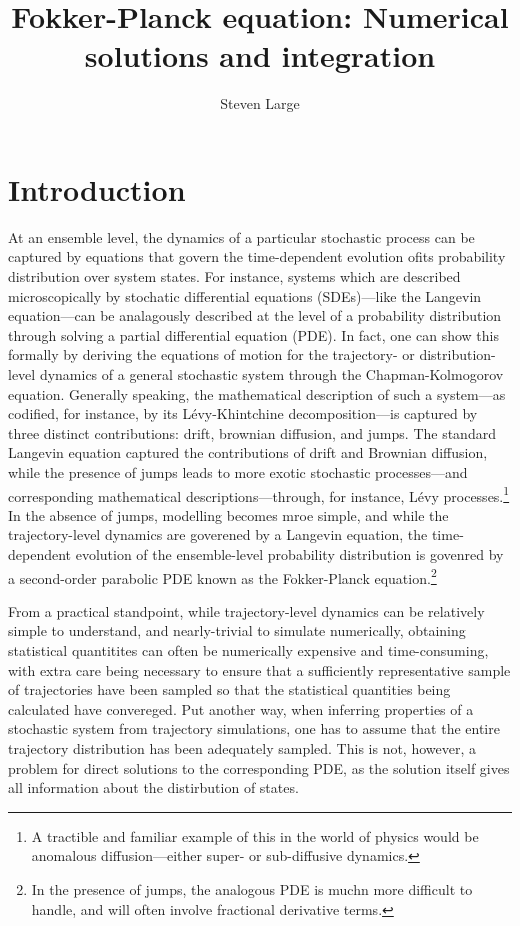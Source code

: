 \documentclass[15pt]{article}
\title{\sf Fokker-Planck equation: Numerical solutions and integration}
\author{\sf Steven Large}
\begin{document}
\maketitle
\tableofcontents
\pagebreak

\section{Introduction}

At an ensemble level, the dynamics of a particular stochastic process can be captured by equations that govern the time-dependent evolution ofits probability distribution over system states. For instance, systems which are described microscopically by stochatic differential equations (SDEs)---like the Langevin equation---can be analagously described at the level of a probability distribution through solving a partial differential equation (PDE).  In fact, one can show this formally by deriving the equations of motion for the trajectory- or distribution-level dynamics of a general stochastic system through the Chapman-Kolmogorov equation. Generally speaking, the mathematical description of such a system---as codified, for instance, by its L\'{e}vy-Khintchine decomposition---is captured by three distinct contributions: drift, brownian diffusion, and jumps. The standard Langevin equation captured the contributions of drift and Brownian diffusion, while the presence of jumps leads to more exotic stochastic processes---and corresponding mathematical descriptions---through, for instance, L\'{e}vy processes.\footnote{A tractible and familiar example of this in the world of physics would be anomalous diffusion---either super- or sub-diffusive dynamics.} In the absence of jumps, modelling becomes mroe simple, and while the trajectory-level dynamics are goverened by a Langevin equation, the time-dependent evolution of the ensemble-level probability distribution is govenred by a second-order parabolic PDE known as the Fokker-Planck equation.\footnote{In the presence of jumps, the analogous PDE is muchn more difficult to handle, and will often involve fractional derivative terms.}

From a practical standpoint, while trajectory-level dynamics can be relatively simple to understand, and nearly-trivial to simulate numerically, obtaining statistical quantitites can often be numerically expensive and time-consuming, with extra care being necessary to ensure that a sufficiently representative sample of trajectories have been sampled so that the statistical quantities being calculated have convereged.  Put another way, when inferring properties of a stochastic system from trajectory simulations, one has to assume that the entire trajectory distribution has been adequately sampled. This is not, however, a problem for direct solutions to the corresponding PDE, as the solution itself gives all information about the distirbution of states.
\end{document}

